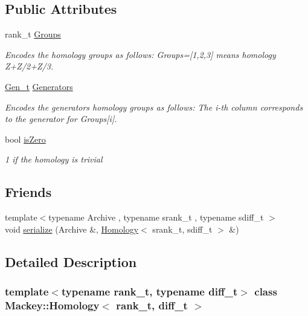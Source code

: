 \subsection*{Public Attributes}
\begin{DoxyCompactItemize}
\item 
rank\+\_\+t \hyperlink{classMackey_1_1Homology_aaae78e6463ce6e60e7f4c5861304bc5b}{Groups}
\begin{DoxyCompactList}\small\item\em Encodes the homology groups as follows\+: Groups=\mbox{[}1,2,3\mbox{]} means homology Z+\+Z/2+\+Z/3. \end{DoxyCompactList}\item 
\hyperlink{classMackey_1_1Homology_a9a8e354083ac094720820a5ff6bcff03}{Gen\+\_\+t} \hyperlink{classMackey_1_1Homology_af3eff7d2cb42b44a29f6a92172096b3d}{Generators}
\begin{DoxyCompactList}\small\item\em Encodes the generators homology groups as follows\+: The i-\/th column corresponds to the generator for Groups\mbox{[}i\mbox{]}. \end{DoxyCompactList}\item 
bool \hyperlink{classMackey_1_1Homology_ae3bb3781bab2b5884295e04a8fddf36e}{is\+Zero}
\begin{DoxyCompactList}\small\item\em 1 if the homology is trivial \end{DoxyCompactList}\end{DoxyCompactItemize}
\subsection*{Friends}
\begin{DoxyCompactItemize}
\item 
{\footnotesize template$<$typename Archive , typename srank\+\_\+t , typename sdiff\+\_\+t $>$ }\\void \hyperlink{classMackey_1_1Homology_afe2aae7d5b96af426bfe7a7898459cb6}{serialize} (Archive \&, \hyperlink{classMackey_1_1Homology}{Homology}$<$ srank\+\_\+t, sdiff\+\_\+t $>$ \&)
\end{DoxyCompactItemize}


\subsection{Detailed Description}
\subsubsection*{template$<$typename rank\+\_\+t, typename diff\+\_\+t$>$\newline
class Mackey\+::\+Homology$<$ rank\+\_\+t, diff\+\_\+t $>$}

